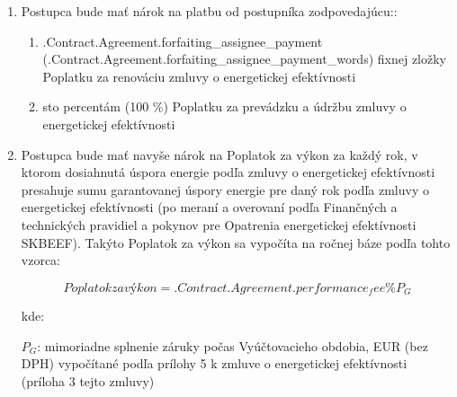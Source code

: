 \documentclass[a4paper]{article}
\begin{document}
\begin{enumerate}
\item{Postupca bude mať nárok na platbu od postupníka zodpovedajúcu::}

  \begin{enumerate}
  \item{ 
       \iffalse input forfaitingFields.forfaiting_assignee_payment value="{{.Contract.Agreement.forfaiting_assignee_payment}}" type="number" \fi {{.Contract.Agreement.forfaiting_assignee_payment}} (\iffalse input forfaitingFields.forfaiting_assignee_payment_words value="{{.Contract.Agreement.forfaiting_assignee_payment_words}}" \fi {{.Contract.Agreement.forfaiting_assignee_payment_words}})
       fixnej zložky Poplatku za renováciu zmluvy o energetickej efektívnosti}

  \item{sto percentám (100 \%) Poplatku za prevádzku a údržbu zmluvy o energetickej efektívnosti}
  \end{enumerate}

\item{Postupca bude mať navyše nárok na Poplatok za výkon za každý rok, v ktorom dosiahnutá úspora energie podľa zmluvy o energetickej efektívnosti presahuje sumu garantovanej úspory energie pre daný rok podľa zmluvy o energetickej efektívnosti (po meraní a overovaní podľa Finančných a technických pravidiel a pokynov pre Opatrenia energetickej efektívnosti SKBEEF). Takýto Poplatok za výkon sa vypočíta na ročnej báze podľa tohto vzorca:\par

    \begin{center}
      \[Poplatok za výkon  = \iffalse input forfaitingFields.performance_fee value="{{.Contract.Agreement.performance_fee}}" type="number" \fi {{.Contract.Agreement.performance_fee}}\% P_G\]
    \end{center}

    kde: \par
    $P_G$: mimoriadne splnenie záruky počas Vyúčtovacieho obdobia, EUR (bez DPH) vypočítané podľa prílohy 5 k zmluve o energetickej efektívnosti (príloha 3 tejto zmluvy)}


\end{enumerate}
\end{document}
